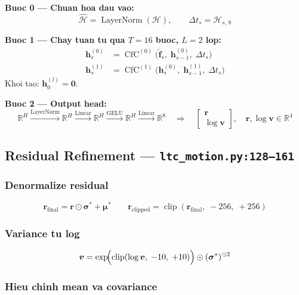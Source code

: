 \documentclass[12pt, a4paper]{article}
\newcommand{\vect}[1]{\bm{#1}}
\newcommand{\clip}{\operatorname{clip}}
\begin{document}
\textbf{Buoc 0 --- Chuan hoa dau vao:}
\[
  \hat{\mathcal{H}} = \operatorname{LayerNorm}(\mathcal{H}),
  \qquad
  \Delta t_s = \mathcal{H}_{s,\,8}
\]

\textbf{Buoc 1 --- Chay tuan tu qua $T = 16$ buoc, $L = 2$ lop:}
\begin{align}
  \vect{h}_s^{(0)} &= \operatorname{CfC}^{(0)}\!\bigl(\hat{\vect{f}}_s,\; \vect{h}_{s-1}^{(0)},\; \Delta t_s\bigr) \\[4pt]
  \vect{h}_s^{(1)} &= \operatorname{CfC}^{(1)}\!\bigl(\vect{h}_s^{(0)},\; \vect{h}_{s-1}^{(1)},\; \Delta t_s\bigr)
\end{align}
Khoi tao: $\vect{h}_0^{(l)} = \vect{0}$.

\textbf{Buoc 2 --- Output head:}
\[
  \mathbb{R}^H \xrightarrow{\text{LayerNorm}}
  \mathbb{R}^H \xrightarrow{\text{Linear}}
  \mathbb{R}^H \xrightarrow{\text{GELU}}
  \mathbb{R}^H \xrightarrow{\text{Linear}}
  \mathbb{R}^{8}
  \quad \Rightarrow \quad
  \begin{bmatrix} \vect{r} \\ \log\vect{v} \end{bmatrix},
  \quad \vect{r}, \log\vect{v} \in \mathbb{R}^4
\]

\subsection{Residual Refinement --- \texttt{ltc\_motion.py:128--161}}

\subsubsection{Denormalize residual}
\[
  \vect{r}_{\text{final}} = \vect{r} \odot \bm{\sigma}^* + \bm{\mu}^*
  \qquad
  \vect{r}_{\text{clipped}} = \clip(\vect{r}_{\text{final}},\; -256,\; +256)
\]

\subsubsection{Variance tu log}
\[
  \vect{v} = \exp\!\Bigl(\clip(\log\vect{v},\; -10,\; +10)\Bigr) \odot (\bm{\sigma}^*)^{\odot 2}
\]

\subsubsection{Hieu chinh mean va covariance}
\end{document}
